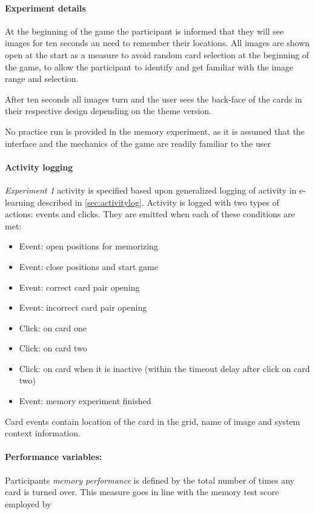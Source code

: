 		\paragraph{Experiment details}
		
		At the beginning of the game the participant is informed that they will see images for ten seconds an need to remember their locations. All images are shown open at the start as a measure to avoid random card selection at the beginning of the game, to allow the participant to identify and get familiar with the image range and selection.
		
		After ten seconds all images turn and the user sees the back-face of the cards in their respective design depending on the theme version.
		
		No practice run is provided in the memory experiment, as it is assumed that the interface and the mechanics of the game are readily familiar to the user 
		
		\paragraph{Activity logging}
		
		\textit{Experiment 1} activity is specified based upon generalized logging of activity in e-learning described in \ref{sec:activitylog}. Activity is logged with two types of actions: events and clicks. They are emitted when each of these conditions are met:
		
		\begin{itemize}
			\item Event: open positions for memorizing
			\item Event: close positions and start game
			\item Event: correct card pair opening
			\item Event: incorrect card pair opening
			\item Click: on card one
			\item Click: on card two
			\item Click: on card when it is inactive (within the timeout delay after click on card two)
			\item Event: memory experiment finished
		\end{itemize}
		
		Card events contain location of the card in the grid, name of image and system context information.
		
		\paragraph{Performance variables:} \label{sec:memory-parameters} Participants \textit{memory performance} is defined by the total number of times any card is turned over. This measure goes in line with the memory test score employed by \cite{McBurney1997}
		
